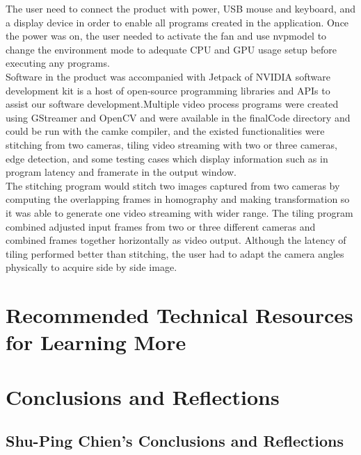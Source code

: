 \documentclass[letterpaper,10pt,serif,draftclsnofoot,onecolumn,compsoc,titlepage]{IEEEtran}
\begin{document}
The user need to connect the product with power, USB mouse and keyboard, and a display device in 
order to enable all programs created in the application. Once the power was on, the user needed 
to activate the fan and use nvpmodel to change the environment mode to adequate CPU and GPU usage 
setup before executing any programs. \\

Software in the product was accompanied with Jetpack of NVIDIA software development kit is a host 
of open-source programming libraries and APIs to assist our software development.Multiple video 
process programs were created using GStreamer and OpenCV and were available in the finalCode 
directory and could be run with the camke compiler, and the existed functionalities were stitching 
from two cameras, tiling video streaming with two or three cameras, edge detection, and some 
testing cases which display information such as in program latency and framerate in the output 
window. \\

The stitching program would stitch two images captured from two cameras by computing the overlapping 
frames in homography and making transformation so it was able to generate one video streaming with 
wider range. The tiling program combined adjusted input frames from two or three different cameras 
and combined frames together horizontally as video output. Although the latency of tiling performed 
better than stitching, the user had to adapt the camera angles physically to acquire side by side 
image. \\

\newpage

\section{Recommended Technical Resources for Learning More}

\newpage

\section{Conclusions and Reflections}

	\subsection{Shu-Ping Chien's Conclusions and Reflections}
\end{document}
